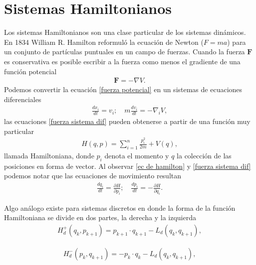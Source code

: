 \section{Sistemas Hamiltonianos}
Los sistemas Hamiltonianos son una clase particular de los sistemas dinámicos. En 1834 William R. Hamilton reformuló la ecuación de Newton ($F=ma$) para un conjunto de partículas puntuales en un campo de fuerzas. Cuando la fuerza $\mathbf{F}$ es conservativa es posible escribir a la fuerza como  menos el gradiente de una función potencial
\begin{eqnarray}
\mathbf{F}=-\nabla V. \label{fuerza potencial}
\end{eqnarray}
Podemos convertir la ecuación \ref{fuerza potencial} en un sistemas de ecuaciones diferenciales
\begin{eqnarray}
\frac{dx_{i}}{dt}=v_{i};   \quad m\frac{dv_{i}}{dt}=-\nabla_{i} V,
\label{fuerza sistema dif}
\end{eqnarray}
las ecuaciones \ref{fuerza sistema dif} pueden obtenerse a partir de una función muy particular
\begin{eqnarray}
H(q,p)=\sum_{i=1}^{n} \frac{p_{i}^{2}}{2m}+V(q), \label{ec de hamilton} 
\end{eqnarray}
llamada Hamiltoniana, donde $p_{i}$ denota el momento y \textbf{$q$} la colección de las posiciones en forma de vector. Al observar \ref{ec de hamilton} y \ref{fuerza sistema dif} podemos notar que las ecuaciones de movimiento resultan
\begin{eqnarray}
\frac{dq_{i}}{dt}=\frac{\partial H}{\partial p_{i}}; \quad
\frac{dp_{i}}{dt}=-\frac{\partial H}{\partial q_{i}}.
\label{ec de mov hamilton}
\end{eqnarray}

Algo análogo existe para sistemas discretos en donde la forma de la función Hamiltoniana se divide en dos partes, la derecha y la izquierda \cite{Tomoki}
\begin{eqnarray}
H_{d}^{+}(q_{k},p_{k+1})=p_{k+1}\cdot q_{k+1}-L_{d}(q_{k},q_{k+1}),
\label{hamiltoniano discreto derecho}
\end{eqnarray}

\begin{eqnarray}
H_{d}^{-}(p_{k},q_{k+1})=-p_{k}\cdot q_{k}-L_{d}(q_{k},q_{k+1}),
\label{hamiltoniano discreto izquierdo}
\end{eqnarray}

